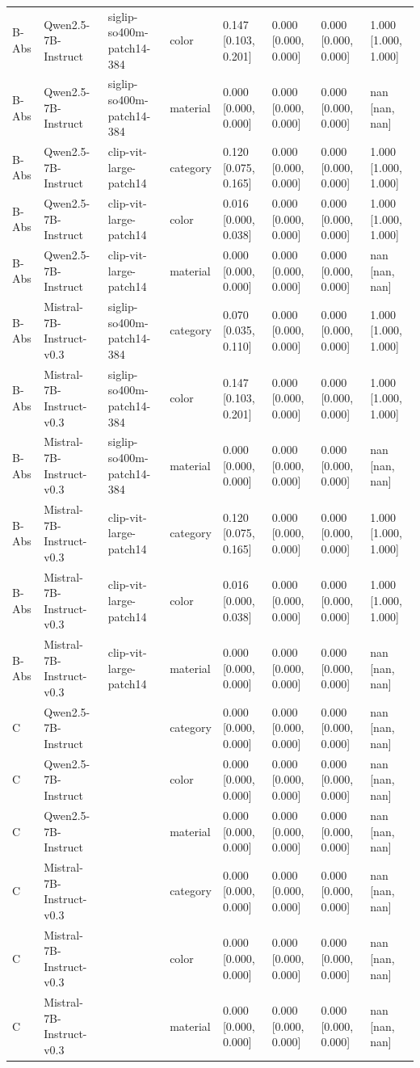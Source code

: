 \begin{tabular}{llllllll}
B-Abs & Qwen2.5-7B-Instruct & siglip-so400m-patch14-384 & color & 0.147 [0.103, 0.201] & 0.000 [0.000, 0.000] & 0.000 [0.000, 0.000] & 1.000 [1.000, 1.000] \\
B-Abs & Qwen2.5-7B-Instruct & siglip-so400m-patch14-384 & material & 0.000 [0.000, 0.000] & 0.000 [0.000, 0.000] & 0.000 [0.000, 0.000] & nan [nan, nan] \\
B-Abs & Qwen2.5-7B-Instruct & clip-vit-large-patch14 & category & 0.120 [0.075, 0.165] & 0.000 [0.000, 0.000] & 0.000 [0.000, 0.000] & 1.000 [1.000, 1.000] \\
B-Abs & Qwen2.5-7B-Instruct & clip-vit-large-patch14 & color & 0.016 [0.000, 0.038] & 0.000 [0.000, 0.000] & 0.000 [0.000, 0.000] & 1.000 [1.000, 1.000] \\
B-Abs & Qwen2.5-7B-Instruct & clip-vit-large-patch14 & material & 0.000 [0.000, 0.000] & 0.000 [0.000, 0.000] & 0.000 [0.000, 0.000] & nan [nan, nan] \\
B-Abs & Mistral-7B-Instruct-v0.3 & siglip-so400m-patch14-384 & category & 0.070 [0.035, 0.110] & 0.000 [0.000, 0.000] & 0.000 [0.000, 0.000] & 1.000 [1.000, 1.000] \\
B-Abs & Mistral-7B-Instruct-v0.3 & siglip-so400m-patch14-384 & color & 0.147 [0.103, 0.201] & 0.000 [0.000, 0.000] & 0.000 [0.000, 0.000] & 1.000 [1.000, 1.000] \\
B-Abs & Mistral-7B-Instruct-v0.3 & siglip-so400m-patch14-384 & material & 0.000 [0.000, 0.000] & 0.000 [0.000, 0.000] & 0.000 [0.000, 0.000] & nan [nan, nan] \\
B-Abs & Mistral-7B-Instruct-v0.3 & clip-vit-large-patch14 & category & 0.120 [0.075, 0.165] & 0.000 [0.000, 0.000] & 0.000 [0.000, 0.000] & 1.000 [1.000, 1.000] \\
B-Abs & Mistral-7B-Instruct-v0.3 & clip-vit-large-patch14 & color & 0.016 [0.000, 0.038] & 0.000 [0.000, 0.000] & 0.000 [0.000, 0.000] & 1.000 [1.000, 1.000] \\
B-Abs & Mistral-7B-Instruct-v0.3 & clip-vit-large-patch14 & material & 0.000 [0.000, 0.000] & 0.000 [0.000, 0.000] & 0.000 [0.000, 0.000] & nan [nan, nan] \\
C & Qwen2.5-7B-Instruct &  & category & 0.000 [0.000, 0.000] & 0.000 [0.000, 0.000] & 0.000 [0.000, 0.000] & nan [nan, nan] \\
C & Qwen2.5-7B-Instruct &  & color & 0.000 [0.000, 0.000] & 0.000 [0.000, 0.000] & 0.000 [0.000, 0.000] & nan [nan, nan] \\
C & Qwen2.5-7B-Instruct &  & material & 0.000 [0.000, 0.000] & 0.000 [0.000, 0.000] & 0.000 [0.000, 0.000] & nan [nan, nan] \\
C & Mistral-7B-Instruct-v0.3 &  & category & 0.000 [0.000, 0.000] & 0.000 [0.000, 0.000] & 0.000 [0.000, 0.000] & nan [nan, nan] \\
C & Mistral-7B-Instruct-v0.3 &  & color & 0.000 [0.000, 0.000] & 0.000 [0.000, 0.000] & 0.000 [0.000, 0.000] & nan [nan, nan] \\
C & Mistral-7B-Instruct-v0.3 &  & material & 0.000 [0.000, 0.000] & 0.000 [0.000, 0.000] & 0.000 [0.000, 0.000] & nan [nan, nan] \\
\bottomrule
\end{tabular}
